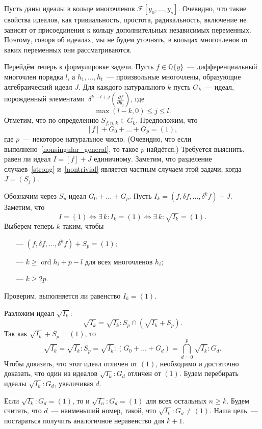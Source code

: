\documentclass[11pt]{article}
\DeclareMathOperator{\ord}{ord}
\renewcommand{\le}{\leqslant}
\renewcommand{\ge}{\geqslant}
\newcommand{\diffField}{\mathcal{F}}
\theoremstyle{plain}
\theoremstyle{definition}
\theoremstyle{remark}
\begin{document}
\bigskip

Пусть даны идеалы в кольце многочленов $\diffField[y_0, \ldots, y_s]$.
Очевидно, что такие свойства идеалов, как тривиальность, простота, радикальность, включение
не зависят от присоединения к кольцу дополнительных независимых переменных.
Поэтому, говоря об идеалах, мы не будем уточнять, в кольцах многочленов от каких переменных они рассматриваются.


\bigskip

Перейдём теперь к формулировке задачи.
Пусть $f \in \mathbb{Q}\{y\}$~--- дифференциальный многочлен порядка $l$,
а $h_1, \ldots, h_t$~--- произвольные многочлены, образующие алгебраический идеал $J$.
Для каждого натурального $k$ пусть $G_k$~--- идеал, порожденный элементами $\,\delta^{k-l+j} \left(\frac{\partial f}{\partial y_j}\right)$, где
$$
 \max(l-k, 0) \le j \le l.
$$
Отметим, что по определению $S_{f,n,k} \in G_k$.
Предположим, что 
$$
 [f] + G_0 + \ldots + G_p = (1),
$$
где $p$~--- некоторое натуральное число.
(Очевидно, что если выполнено~\eqref{nonsingular_general}, то такое $p$ найдётся.)
Требуется выяснить, равен ли идеал $I = [f] + J$ единичному.
Заметим, что разделение случаев~\eqref{strong} и~\eqref{nontrivial} является частным случаем этой задачи, когда $J = (S_f)$.

\bigskip


Обозначим через $S_p$ идеал $G_0 + \ldots + G_p$.
Пусть $I_k = (f, \delta f, \ldots, \delta^k f) + J$. Заметим, что 
$$
 I = (1) \iff \exists \, k: I_k = (1) \iff \exists \, k: \sqrt{I_k} = (1).
$$
Выберем теперь $k$ таким, чтобы
\begin{itemize}
\item[---] $(f, \delta f, \ldots, \delta^k f) + S_p = (1)$;
\item[---] $k \ge \ord h_i + p - l$ для всех многочленов $h_i$;
\item[---] $k \ge 2p$.
\end{itemize}
Проверим, выполняется ли равенство $I_k = (1)$.

Разложим идеал $\sqrt{I_k}$:
$$
 \sqrt{I_k} = \sqrt{I_k} : S_p  \cap  \left(\sqrt{I_k} + S_p\right).
$$
Так как $\sqrt{I_k} + S_p = (1)$, то
$$
 \sqrt{I_k} = \sqrt{I_k} : S_p = \sqrt{I_k} : (G_0 + \ldots + G_d) = \bigcap\limits_{d = 0}^p \sqrt{I_k} : G_d.
$$
Чтобы доказать, что этот идеал отличен от $(1)$, необходимо и достаточно доказать, что один из идеалов $\sqrt{I_k}:G_d$ отличен от $(1)$.
Будем перебирать идеалы $\sqrt{I_k} : G_d$, увеличивая $d$.

Если $\sqrt{I_k} : G_d = (1)$, то и $\sqrt{I_n} : G_d = (1)$ для всех остальных $n \ge k$.
Будем считать, что $d$~--- наименьший номер, такой, что $\sqrt{I_k} : G_d \ne (1)$.
Наша цель~--- постараться получить аналогичное неравенство для $k+1$.
\end{document}
